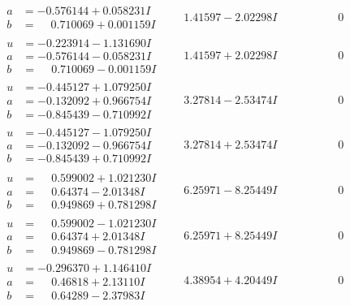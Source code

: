 \documentclass[1p]{elsarticle_modified}
\theoremstyle{definition}
\begin{document}
$$\begin{array}{c|c|c}
\begin{aligned}
a &= -0.576144 + 0.058231 I \\
b &= \phantom{-}0.710069 + 0.001159 I\end{aligned}
 & \phantom{-}1.41597 - 2.02298 I & \phantom{-0.000000 } 0 \\ \hline\begin{aligned}
u &= -0.223914 - 1.131690 I \\
a &= -0.576144 - 0.058231 I \\
b &= \phantom{-}0.710069 - 0.001159 I\end{aligned}
 & \phantom{-}1.41597 + 2.02298 I & \phantom{-0.000000 } 0 \\ \hline\begin{aligned}
u &= -0.445127 + 1.079250 I \\
a &= -0.132092 + 0.966754 I \\
b &= -0.845439 - 0.710992 I\end{aligned}
 & \phantom{-}3.27814 - 2.53474 I & \phantom{-0.000000 } 0 \\ \hline\begin{aligned}
u &= -0.445127 - 1.079250 I \\
a &= -0.132092 - 0.966754 I \\
b &= -0.845439 + 0.710992 I\end{aligned}
 & \phantom{-}3.27814 + 2.53474 I & \phantom{-0.000000 } 0 \\ \hline\begin{aligned}
u &= \phantom{-}0.599002 + 1.021230 I \\
a &= \phantom{-}0.64374 - 2.01348 I \\
b &= \phantom{-}0.949869 + 0.781298 I\end{aligned}
 & \phantom{-}6.25971 - 8.25449 I & \phantom{-0.000000 } 0 \\ \hline\begin{aligned}
u &= \phantom{-}0.599002 - 1.021230 I \\
a &= \phantom{-}0.64374 + 2.01348 I \\
b &= \phantom{-}0.949869 - 0.781298 I\end{aligned}
 & \phantom{-}6.25971 + 8.25449 I & \phantom{-0.000000 } 0 \\ \hline\begin{aligned}
u &= -0.296370 + 1.146410 I \\
a &= \phantom{-}0.46818 + 2.13110 I \\
b &= \phantom{-}0.64289 - 2.37983 I\end{aligned}
 & \phantom{-}4.38954 + 4.20449 I & \phantom{-0.000000 } 0 \\ \hline\begin{aligned}

\end{aligned}
\end{array}$$
\end{document}
